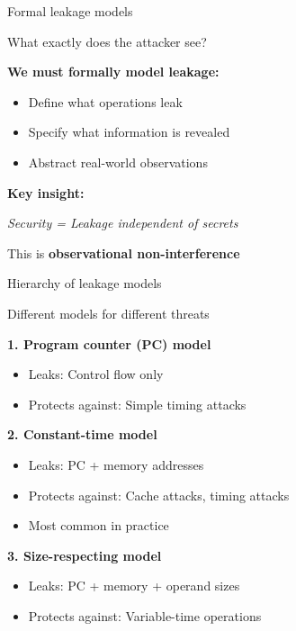 \documentclass[aspectratio=169, lualatex, handout]{beamer}
\begin{document}
\begin{frame}{Formal leakage models}
	\begin{center}
		\Large
		What exactly does the attacker see?
	\end{center}
	\vspace{1em}
	\textbf{We must formally model leakage:}
	\begin{itemize}
		\item Define what operations leak
		\item Specify what information is revealed
		\item Abstract real-world observations
	\end{itemize}
	\vspace{0.5em}
	\textbf{Key insight:}
	\begin{center}
		\textit{Security = Leakage independent of secrets}
	\end{center}
	\vspace{0.5em}
	This is \textbf{observational non-interference}
\end{frame}

\begin{frame}{Hierarchy of leakage models}
	\begin{center}
		\Large
		Different models for different threats
	\end{center}
	\vspace{1em}
	\textbf{1. Program counter (PC) model}
	\begin{itemize}
		\item Leaks: Control flow only
		\item Protects against: Simple timing attacks
	\end{itemize}
	\vspace{0.5em}
	\textbf{2. Constant-time model}
	\begin{itemize}
		\item Leaks: PC + memory addresses
		\item Protects against: Cache attacks, timing attacks
		\item Most common in practice
	\end{itemize}
	\vspace{0.5em}
	\textbf{3. Size-respecting model}
	\begin{itemize}
		\item Leaks: PC + memory + operand sizes
		\item Protects against: Variable-time operations
	\end{itemize}
\end{frame}
\end{document}
